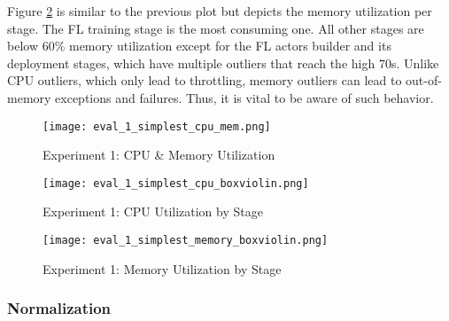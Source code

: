 Figure \ref{fig:eval_1_simplest_memory_boxviolin} is similar to the previous plot but depicts the memory utilization per stage.
The FL training stage is the most consuming one.
All other stages are below 60\% memory utilization except for the FL actors builder and its deployment stages, which have multiple outliers that reach the high 70s.
Unlike CPU outliers, which only lead to throttling, memory outliers can lead to out-of-memory exceptions and failures.
Thus, it is vital to be aware of such behavior.

\begin{figure}[H]
    \begin{adjustwidth}{-0.2\paperwidth}{-0.2\paperwidth}
        \centering
        \texttt{[image: eval\_1\_simplest\_cpu\_mem.png]}
        \caption{Experiment 1: CPU \& Memory Utilization}
        \label{fig:eval_1_simplest_cpu_mem}
    \end{adjustwidth}
\end{figure}

\begin{figure}[p]
    \begin{adjustwidth}{-0.2\paperwidth}{-0.2\paperwidth}
        \centering
        \texttt{[image: eval\_1\_simplest\_cpu\_boxviolin.png]}
        \caption{Experiment 1: CPU Utilization by Stage}
        \label{fig:eval_1_simplest_cpu_boxviolin}
    \end{adjustwidth}

    \begin{adjustwidth}{-0.2\paperwidth}{-0.2\paperwidth}
        \centering
        \texttt{[image: eval\_1\_simplest\_memory\_boxviolin.png]}
        \caption{Experiment 1: Memory Utilization by Stage}
        \label{fig:eval_1_simplest_memory_boxviolin}
    \end{adjustwidth}
\end{figure}

\pagebreak
\subsubsection{Normalization}

